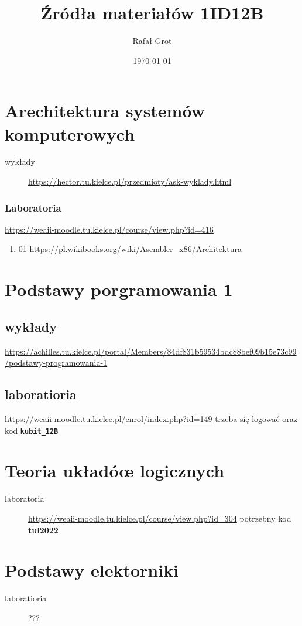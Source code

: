 \documentclass[11pt]{article}
\author{Rafał Grot}
\date{\today}
\title{Źródła materiałów 1ID12B}
\begin{document}
\maketitle
\tableofcontents


\section{Arechitektura systemów komputerowych}
\label{sec:orge18ae55}
\begin{description}
\item[{wykłady}] \url{https://hector.tu.kielce.pl/przedmioty/ask-wyklady.html}
\end{description}
\subsubsection{Laboratoria}
\label{sec:orgb5691d1}
\url{https://weaii-moodle.tu.kielce.pl/course/view.php?id=416}
\begin{enumerate}
\item 01
\label{sec:org8286168}
\url{https://pl.wikibooks.org/wiki/Asembler\_x86/Architektura}
\end{enumerate}
\section{Podstawy porgramowania 1}
\label{sec:org1e996c3}
\subsection{wykłady}
\label{sec:org60ec2ba}
\url{https://achilles.tu.kielce.pl/portal/Members/84df831b59534bdc88bef09b15e73c99/podstawy-programowania-1}
\subsection{laboratioria}
\label{sec:org642f9df}
\url{https://weaii-moodle.tu.kielce.pl/enrol/index.php?id=149} trzeba się logować oraz kod \textbf{\texttt{kubit\_12B}}
\section{Teoria układóœ logicznych}
\label{sec:org83e7f5f}
\begin{description}
\item[{laboratoria}] \url{https://weaii-moodle.tu.kielce.pl/course/view.php?id=304} potrzebny kod \textbf{tul2022}
\end{description}
\section{Podstawy elektorniki}
\label{sec:orgc970c0c}
\begin{description}
\item[{laboratioria}] ???
\end{description}
\end{document}
